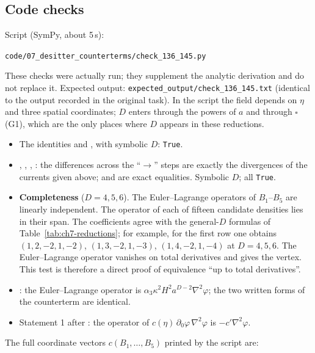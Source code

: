 \subsection{Code checks}
\label{ssec:ch7-t15-code}
\tC{}
Script (SymPy, about 5\,s):
\begin{center}\texttt{code/07\_desitter\_counterterms/check\_136\_145.py}\end{center}
These checks were actually run; they supplement the analytic derivation and do not replace it.
Expected output: \texttt{expected\_output/}\allowbreak\texttt{check\_136\_145.txt} (identical to the output recorded in the original task).
In the script the field depends on $\eta$ and three spatial coordinates; $D$ enters through the powers of $a$ and through $\square$ (G1), which are the only places where $D$ appears in these reductions.
\begin{itemize}[leftmargin=14pt]
\item The identities  and , with symbolic $D$: \texttt{True}.
\item {}, , , : the differences across the ``$\to$'' steps are exactly the divergences of the currents given above;  and  are exact equalities. Symbolic $D$; all \texttt{True}.
\item \textbf{Completeness} ($D=4,5,6$). The Euler--Lagrange operators of $B_1$--$B_5$ are linearly independent.
The operator of each of fifteen candidate densities lies in their span.
The coefficients agree with the general-$D$ formulas of Table~\ref{tab:ch7-reductions}; for example, for the first row one obtains $(1,2,-2,1,-2)$, $(1,3,-2,1,-3)$, $(1,4,-2,1,-4)$ at $D=4,5,6$.
The Euler--Lagrange operator vanishes on total derivatives and gives the vertex. This test is therefore a direct proof of equivalence ``up to total derivatives''.
\item {}: the Euler--Lagrange operator is $\alpha_3\kappa^2H^2a^{D-2}\nabla^2\varphi$; the two written forms of the counterterm are identical.
\item Statement 1 after : the operator of $c(\eta)\,\partial_0\varphi\,\nabla^2\varphi$ is $-c'\nabla^2\varphi$.
\end{itemize}
The full coordinate vectors $c(B_1,\ldots,B_5)$ printed by the script are:

